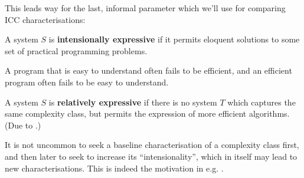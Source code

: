 
This leads way for the last, informal parameter which we'll use for comparing
ICC characterisations:


\begin{notion} A system $S$ is \textbf{intensionally expressive} if it permits
eloquent solutions to some set of practical programming problems.\end{notion}


A program that is easy to understand often fails to be efficient, and an
efficient program often fails to be easy to understand.

\begin{notion} A system $S$ is \textbf{relatively expressive} if there is no
system $T$ which captures the same complexity class, but permits the expression
of more efficient algorithms. (Due to \cite{jones-2001}.) \end{notion}

It is not uncommon to seek a baseline characterisation of a complexity class
first, and then later to seek to increase its ``intensionality'', which in
itself may lead to new characterisations. This is indeed the motivation in e.g.
\cite{hofmann-1999, niggl-2005, marion-pechoux-2008, jones-kristiansen-2009}.






